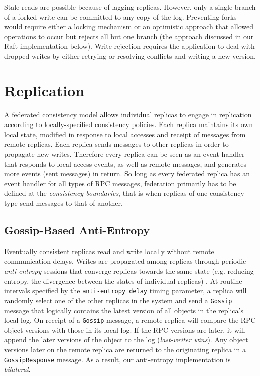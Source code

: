 \documentclass[10pt,conference,letterpaper]{IEEEtran}
\begin{document}
Stale reads are possible because of lagging replicas.
However, only a single branch of a forked write can be committed to any copy of the log.
Preventing forks would require either a locking mechanism or an optimistic approach that
allowed operations to occur but rejects all but one branch (the approach discussed in our
Raft implementation below).
Write rejection requires the application to deal with dropped writes by either retrying or
resolving conflicts and writing a new version.

\section{Replication}
\label{sec:replication}
A federated consistency model allows individual replicas to
engage in replication according to locally-specified consistency policies.
Each replica maintains its own local state, modified in response to local accesses
and receipt of messages from remote replicas.
Each replica sends messages to other replicas in order to propagate new writes.
Therefore every replica can be seen as an event handler that responds to local access
events, as well as remote messages, and generates more events (sent messages) in return.
So long as every federated replica has an event handler for all types of RPC
messages, federation primarily has to be defined at the \textit{consistency boundaries},
that is when replicas of one consistency type send messages to that of another.


\subsection{Gossip-Based Anti-Entropy}

Eventually consistent replicas  read and write locally without remote communication delays.
Writes are propagated among replicas through
periodic \textit{anti-entropy} sessions that
converge replicas towards the same state (e.g.
reducing entropy, the divergence between the states of individual replicas)
\cite{kempe_gossip-based_2003}.
At routine intervals specified by the \texttt{anti-entropy delay} timing parameter, a
replica will randomly select one of the other replicas in the system and send a
\texttt{Gossip} message that logically contains the latest version of all objects in the replica's
local log.
On receipt of a \texttt{Gossip} message, a remote replica will compare the RPC object
versions with those in its local log.
If the RPC versions are later, it will append the later versions of the object to the log
(\textit{last-writer wins}).
Any object versions later on the remote replica are returned to the
originating replica in a \texttt{GossipResponse} message.
As a result, our anti-entropy implementation is \textit{bilateral}.
\end{document}

